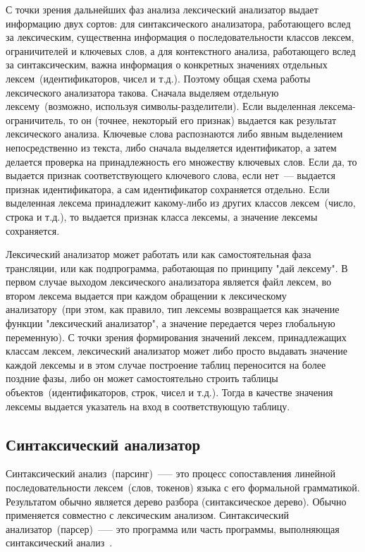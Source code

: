 С точки зрения дальнейших фаз анализа лексический анализатор выдает
информацию двух сортов: для синтаксического анализатора, работающего
вслед за лексическим, существенна информация о последовательности
классов лексем, ограничителей и ключевых слов, а для контекстного
анализа, работающего вслед за синтаксическим, важна информация о
конкретных значениях отдельных лексем~(идентификаторов, чисел и т.д.).
Поэтому общая схема работы лексического анализатора такова.  Сначала
выделяем отдельную лексему~(возможно, используя символы-разделители).
Если выделенная лексема-ограничитель, то он (точнее, некоторый его
признак) выдается как результат лексического анализа.  Ключевые слова
распознаются либо явным выделением непосредственно из текста, либо
сначала выделяется идентификатор, а затем делается проверка на
принадлежность его множеству ключевых слов.  Если да, то выдается
признак соответствующего ключевого слова, если нет~--- выдается признак
идентификатора, а сам идентификатор сохраняется отдельно.  Если
выделенная лексема принадлежит какому-либо из других классов
лексем~(число, строка и т.д.), то выдается признак класса лексемы, а
значение лексемы сохраняется.

Лексический анализатор может работать или как самостоятельная фаза
трансляции, или как подпрограмма, работающая по принципу "дай
лексему".  В первом случае выходом лексического анализатора является
файл лексем, во втором лексема выдается при каждом обращении к
лексическому анализатору~(при этом, как правило, тип лексемы
возвращается как значение функции "лексический анализатор", а значение
передается через глобальную переменную).  С точки зрения формирования
значений лексем, принадлежащих классам лексем, лексический анализатор
может либо просто выдавать значение каждой лексемы и в этом случае
построение таблиц переносится на более поздние фазы, либо он может
самостоятельно строить таблицы объектов~(идентификаторов, строк, чисел
и т.д.).  Тогда в качестве значения лексемы выдается указатель
на вход в соответствующую таблицу.

\subsection{Синтаксический анализатор}
\label{sec:syntax}

Синтаксический анализ~(парсинг)~--— это процесс сопоставления линейной
последовательности лексем~(слов, токенов) языка с его формальной
грамматикой.  Результатом обычно является дерево разбора
(синтаксическое дерево).  Обычно применяется совместно с лексическим
анализом.  Синтаксический анализатор~(парсер)~--— это программа или
часть программы, выполняющая синтаксический анализ~\cite{syntax_wiki}.

